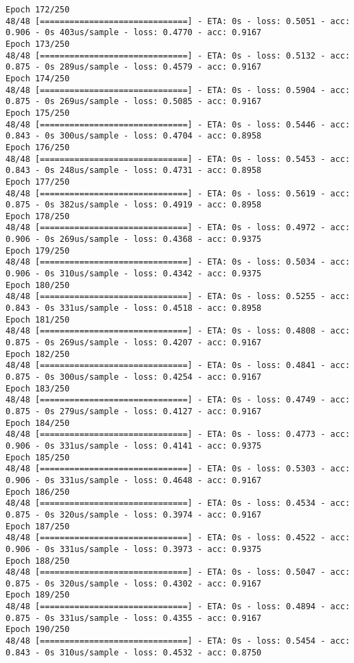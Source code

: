 \documentclass[11pt]{article}
\begin{document}
\begin{Verbatim}[commandchars=\\\{\}]
Epoch 172/250
48/48 [==============================] - ETA: 0s - loss: 0.5051 - acc: 0.906 - 0s 403us/sample - loss: 0.4770 - acc: 0.9167
Epoch 173/250
48/48 [==============================] - ETA: 0s - loss: 0.5132 - acc: 0.875 - 0s 289us/sample - loss: 0.4579 - acc: 0.9167
Epoch 174/250
48/48 [==============================] - ETA: 0s - loss: 0.5904 - acc: 0.875 - 0s 269us/sample - loss: 0.5085 - acc: 0.9167
Epoch 175/250
48/48 [==============================] - ETA: 0s - loss: 0.5446 - acc: 0.843 - 0s 300us/sample - loss: 0.4704 - acc: 0.8958
Epoch 176/250
48/48 [==============================] - ETA: 0s - loss: 0.5453 - acc: 0.843 - 0s 248us/sample - loss: 0.4731 - acc: 0.8958
Epoch 177/250
48/48 [==============================] - ETA: 0s - loss: 0.5619 - acc: 0.875 - 0s 382us/sample - loss: 0.4919 - acc: 0.8958
Epoch 178/250
48/48 [==============================] - ETA: 0s - loss: 0.4972 - acc: 0.906 - 0s 269us/sample - loss: 0.4368 - acc: 0.9375
Epoch 179/250
48/48 [==============================] - ETA: 0s - loss: 0.5034 - acc: 0.906 - 0s 310us/sample - loss: 0.4342 - acc: 0.9375
Epoch 180/250
48/48 [==============================] - ETA: 0s - loss: 0.5255 - acc: 0.843 - 0s 331us/sample - loss: 0.4518 - acc: 0.8958
Epoch 181/250
48/48 [==============================] - ETA: 0s - loss: 0.4808 - acc: 0.875 - 0s 269us/sample - loss: 0.4207 - acc: 0.9167
Epoch 182/250
48/48 [==============================] - ETA: 0s - loss: 0.4841 - acc: 0.875 - 0s 300us/sample - loss: 0.4254 - acc: 0.9167
Epoch 183/250
48/48 [==============================] - ETA: 0s - loss: 0.4749 - acc: 0.875 - 0s 279us/sample - loss: 0.4127 - acc: 0.9167
Epoch 184/250
48/48 [==============================] - ETA: 0s - loss: 0.4773 - acc: 0.906 - 0s 331us/sample - loss: 0.4141 - acc: 0.9375
Epoch 185/250
48/48 [==============================] - ETA: 0s - loss: 0.5303 - acc: 0.906 - 0s 331us/sample - loss: 0.4648 - acc: 0.9167
Epoch 186/250
48/48 [==============================] - ETA: 0s - loss: 0.4534 - acc: 0.875 - 0s 320us/sample - loss: 0.3974 - acc: 0.9167
Epoch 187/250
48/48 [==============================] - ETA: 0s - loss: 0.4522 - acc: 0.906 - 0s 331us/sample - loss: 0.3973 - acc: 0.9375
Epoch 188/250
48/48 [==============================] - ETA: 0s - loss: 0.5047 - acc: 0.875 - 0s 320us/sample - loss: 0.4302 - acc: 0.9167
Epoch 189/250
48/48 [==============================] - ETA: 0s - loss: 0.4894 - acc: 0.875 - 0s 331us/sample - loss: 0.4355 - acc: 0.9167
Epoch 190/250
48/48 [==============================] - ETA: 0s - loss: 0.5454 - acc: 0.843 - 0s 310us/sample - loss: 0.4532 - acc: 0.8750

\end{Verbatim}
\end{document}
